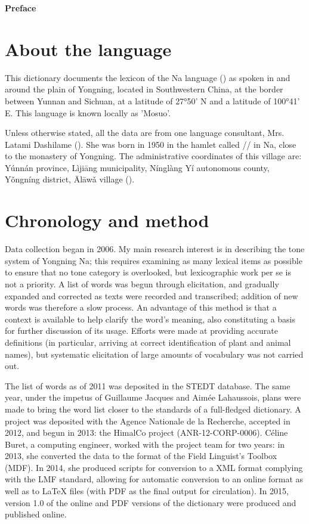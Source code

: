 	{\LARGE \textbf{Preface}}
	\section{About the language} \label{sec:language}

This dictionary documents the lexicon of the Na language () as spoken in and around the plain of Yongning, located in Southwestern China, at the border between Yunnan and Sichuan, at a latitude of 27°50’ N and a latitude of 100°41’ E. This language is known locally as 'Mosuo'. 

Unless otherwise stated, all the data are from one language consultant, Mrs. Latami Dashilame (). She was born in 1950 in the hamlet called // in Na, close to the monastery of Yongning. The administrative coordinates of this village are: Yúnnán province, Lìjiāng municipality, Nínglàng Yí autonomous county, Yǒngníng district, Ālāwǎ village (). 

	\section{Chronology and method} \label{sec:method}

Data collection began in 2006. My main research interest is in describing the tone system of Yongning Na; this requires examining as many lexical items as possible to ensure that no tone category is overlooked, but lexicographic work per se is not a priority. A list of words was begun through elicitation, and gradually expanded and corrected as texts were recorded and transcribed; addition of new words was therefore a slow process. An advantage of this method is that a context is available to help clarify the word's meaning, also constituting a basis for further discussion of its usage. Efforts were made at providing accurate definitions (in particular, arriving at correct identification of plant and animal names), but systematic elicitation of large amounts of vocabulary was not carried out. 

The list of words as of 2011 was deposited in the STEDT database. The same year, under the impetus of Guillaume Jacques and Aimée Lahaussois, plans were made to bring the word list closer to the standards of a full-fledged dictionary. A project was deposited with the Agence Nationale de la Recherche, accepted in 2012, and begun in 2013: the HimalCo project (ANR-12-CORP-0006). Céline Buret, a computing engineer, worked with the project team for two years: in 2013, she converted the data to the format of the Field Linguist's Toolbox (MDF). In 2014, she produced scripts for conversion to a XML format complying with the LMF standard, allowing for automatic conversion to an online format as well as to LaTeX files (with PDF as the final output for circulation). In 2015, version 1.0 of the online and PDF versions of the dictionary were produced and published online.

